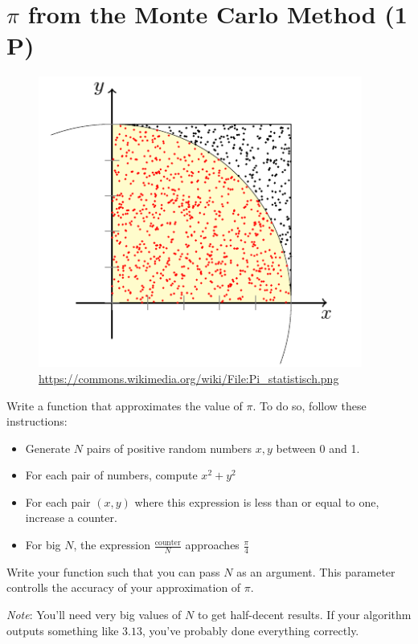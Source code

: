 \documentclass[
	english,
	fontsize=10pt,
	parskip=half,
	titlepage=true,
	DIV=12
]{scrartcl}
\begin{document}
\section{$\pi$ from the Monte Carlo Method (1 P)}
\begin{figure}
\vspace{-20pt}
\includegraphics[width=\linewidth]{MCarlo}
\caption{\url{https://commons.wikimedia.org/wiki/File:Pi_statistisch.png}}
\label{fig:MCPI}
\vspace{-50pt}
\end{figure}
%
Write a function that approximates the value of $\pi$. To do so, follow these instructions:
\begin{itemize}
\item Generate $N$ pairs of positive random numbers $x, y$ between 0 and 1.
\item For each pair of numbers, compute $x^2 + y^2$
\item For each pair $(x, y)$ where this expression is less than or equal to one, increase a counter.
\item For big $N$, the expression $\frac{\text{counter}}{N}$ approaches $\frac{\pi}{4}$
\end{itemize}

Write your function such that you can pass $N$ as an argument. This parameter controlls the accuracy of your approximation of $\pi$.

\emph{Note}: You'll need very big values of $N$ to get half-decent results. If your algorithm outputs something like $3.13$, you've probably done everything correctly.
\end{document}
